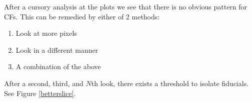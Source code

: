 \documentclass[10pt]{scrartcl}
\begin{document}

After a cursory analysis at the plots we see that there is no obvious pattern for CFs. This can be remedied by either of 2 methods:

\begin{enumerate}
    \item Look at more pixels
    \item Look in a different manner
    \item A combination of the above
\end{enumerate}

After a second, third, and $N$th look, there exists a threshold to isolate fiducials. See Figure \ref{betterslice}.\\

\end{document}

